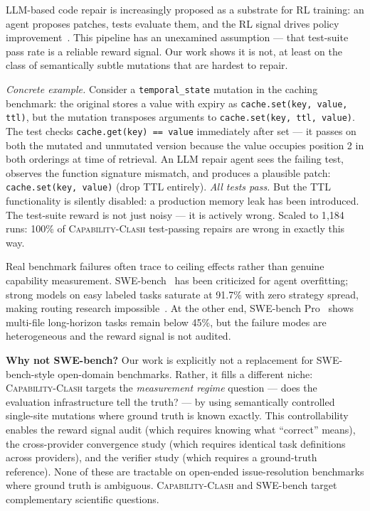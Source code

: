 \documentclass[sigconf,review,anonymous]{acmart}
\newcommand{\ccbench}{\textsc{Capability-Clash}}
\begin{document}
LLM-based code repair is increasingly proposed as a substrate for RL training: an agent proposes patches, tests evaluate them, and the RL signal drives policy improvement~\cite{wei2025swerl}. This pipeline has an unexamined assumption — that test-suite pass rate is a reliable reward signal. Our work shows it is not, at least on the class of semantically subtle mutations that are hardest to repair.

\smallskip
\noindent\textit{Concrete example.}
Consider a \texttt{temporal\_state} mutation in the caching benchmark: the original stores a value with expiry as \texttt{cache.set(key, value, ttl)}, but the mutation transposes arguments to \texttt{cache.set(key, ttl, value)}. The test checks \texttt{cache.get(key) == value} immediately after set — it passes on both the mutated and unmutated version because the value occupies position 2 in both orderings at time of retrieval. An LLM repair agent sees the failing test, observes the function signature mismatch, and produces a plausible patch: \texttt{cache.set(key, value)} (drop TTL entirely). \emph{All tests pass.} But the TTL functionality is silently disabled: a production memory leak has been introduced. The test-suite reward is not just noisy — it is actively wrong. Scaled to 1{,}184 runs: 100\% of \ccbench{} test-passing repairs are wrong in exactly this way.
\smallskip

Real benchmark failures often trace to ceiling effects rather than genuine capability measurement. SWE-bench~\cite{jimenez2024swebench} has been criticized for agent overfitting; strong models on easy labeled tasks saturate at 91.7\% with zero strategy spread, making routing research impossible~\cite{gabriel2024decomposing}. At the other end, SWE-bench Pro~\cite{deng2025swebenchpro} shows multi-file long-horizon tasks remain below 45\%, but the failure modes are heterogeneous and the reward signal is not audited.

\textbf{Why not SWE-bench?} Our work is explicitly not a replacement for SWE-bench-style open-domain benchmarks. Rather, it fills a different niche: \ccbench{} targets the \emph{measurement regime} question — does the evaluation infrastructure tell the truth? — by using semantically controlled single-site mutations where ground truth is known exactly. This controllability enables the reward signal audit (which requires knowing what ``correct'' means), the cross-provider convergence study (which requires identical task definitions across providers), and the verifier study (which requires a ground-truth reference). None of these are tractable on open-ended issue-resolution benchmarks where ground truth is ambiguous. \ccbench{} and SWE-bench target complementary scientific questions.
\end{document}
